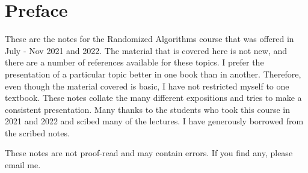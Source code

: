 \chapter*{Preface}

These are the notes for the Randomized Algorithms course that was offered in
July - Nov 2021 and 2022. The material that is covered here is not new, and
there are a number of references available for these topics. I prefer the presentation of a particular topic better in one book
than in another. Therefore, even though the material covered is basic, I have
not restricted myself to one textbook. These notes collate the many different
expositions and tries to make a consistent presentation. Many thanks to the
students who took this course in 2021 and 2022 and scibed many of the
lectures. I have generously borrowed from the scribed notes.

These notes are not proof-read and may contain errors. If you find any, please
email me.

